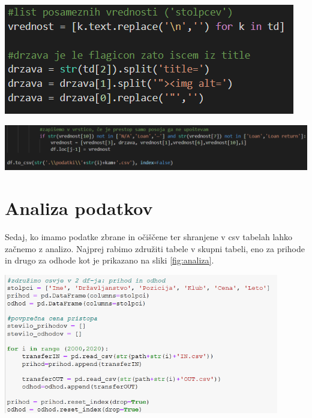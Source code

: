 \documentclass[a4paper, 12pt]{article}
\begin{document}
\pagebreak
\begin{center}
\includegraphics{html3}
\label{fig:htmlDrzava}

\includegraphics[width=1\textwidth]{html4}
\label{fig:htmlCSV}
\end{center}
\section{Analiza podatkov}
Sedaj, ko imamo podatke zbrane in očiščene ter shranjene v csv tabelah lahko začnemo z analizo. Najprej rabimo združiti tabele v skupni tabeli, eno za prihode in drugo za odhode kot je prikazano na sliki \ref{fig:analiza}. \\

\begin{center}
\includegraphics[width=0.9\textwidth]{analiza}
\label{fig:analiza}
\end{center}
\end{document}
